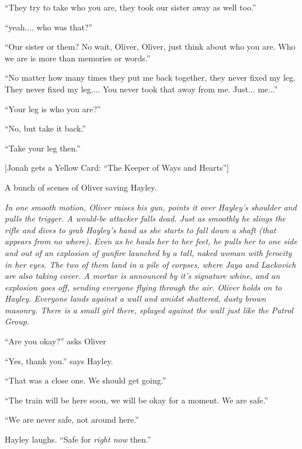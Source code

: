 ``They try to take who you are, they took our sister away as well too.''

``yeah.... who was that?''

``Our sister or them?  No wait, Oliver, Oliver, just think about who you are.  Who we are is more than memories or words.''

``No matter how many times they put me back together, they never fixed my leg.  They never fixed my leg.... You never took that away from me.  Just... me...''

``Your leg is who you are?''

``No, but take it back.''

``Take your leg then.'' 



{[}Jonah gets a Yellow Card: ``The Keeper of Ways and Hearts''{]}






A bunch of scenes of Oliver saving Hayley.



\textit{In one smooth motion, Oliver raises his gun, points it over Hayley's shoulder and pulls the trigger. A would-be attacker falls dead. Just as smoothly he slings the rifle and dives to grab Hayley's hand as she starts to fall down a shaft (that appears from no where). Even as he hauls her to her feet, he pulls her to one side and out of an explosion of gunfire launched by a tall, naked woman with ferocity in her eyes. The two of them land in a pile of corpses, where Jaya and Lackovich are also taking cover. A mortar is announced by it's signature whine, and an explosion goes off, sending everyone flying through the air. Oliver holds on to Hayley. Everyone lands against a wall and amidst shattered, dusty brown masonry. There is a small girl there, splayed against the wall just like the Patrol Group.}



``Are you okay?'' asks Oliver

``Yes, thank you.'' says Hayley.

``That was a close one.  We should get going.''

``The train will be here soon, we will be okay for a moment.  We are safe.''

``We are never safe, not around here.''

Hayley laughs.  ``Safe for \textit{right now} then.''

